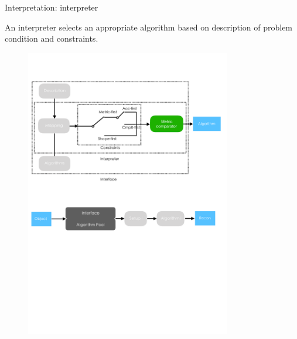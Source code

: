 \documentclass[10pt]{beamer}
\begin{document}



\begin{frame}{Interpretation: interpreter}

An interpreter selects an appropriate algorithm based on description of problem condition and constraints.

\begin{figure}[!htbp]
\centering
\includegraphics[width=0.8\textwidth]{interp/interpreter.pdf}
\end{figure}

\end{frame}
\end{document}
